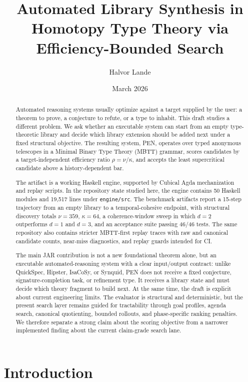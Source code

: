 \documentclass[11pt,a4paper]{article}
\title{\textbf{Automated Library Synthesis in Homotopy Type Theory via Efficiency-Bounded Search}}
\author{Halvor Lande}
\date{March 2026}
\begin{document}
\maketitle

\begin{abstract}
Automated reasoning systems usually optimize against a target supplied by the user: a theorem to prove, a conjecture to refute, or a type to inhabit. This draft studies a different problem. We ask whether an executable system can start from an empty type-theoretic library and decide which library extension should be added next under a fixed structural objective. The resulting system, PEN, operates over typed anonymous telescopes in a Minimal Binary Type Theory (MBTT) grammar, scores candidates by a target-independent efficiency ratio $\rho=\nu/\kappa$, and accepts the least supercritical candidate above a history-dependent bar.

The artifact is a working Haskell engine, supported by Cubical Agda mechanization and replay scripts. In the repository state studied here, the engine contains 50 Haskell modules and 19{,}517 lines under \texttt{engine/src}. The benchmark artifacts report a 15-step trajectory from an empty library to a temporal-cohesive endpoint, with structural discovery totals $\nu=359$, $\kappa=64$, a coherence-window sweep in which $d=2$ outperforms $d=1$ and $d=3$, and an acceptance suite passing 46/46 tests. The same repository also contains stricter MBTT-first replay traces with raw and canonical candidate counts, near-miss diagnostics, and replay guards intended for CI.

The main JAR contribution is not a new foundational theorem alone, but an executable automated-reasoning system with a clear input/output contract: unlike QuickSpec, Hipster, IsaCoSy, or Synquid, PEN does not receive a fixed conjecture, signature-completion task, or refinement type. It receives a library state and must decide which theory fragment to build next. At the same time, the draft is explicit about current engineering limits. The evaluator is structural and deterministic, but the present search layer remains guided for tractability through goal profiles, agenda search, canonical quotienting, bounded rollouts, and phase-specific ranking penalties. We therefore separate a strong claim about the scoring objective from a narrower implemented finding about the current claim-grade search lane.
\end{abstract}

\section{Introduction}
\label{sec:introduction}
\end{document}
